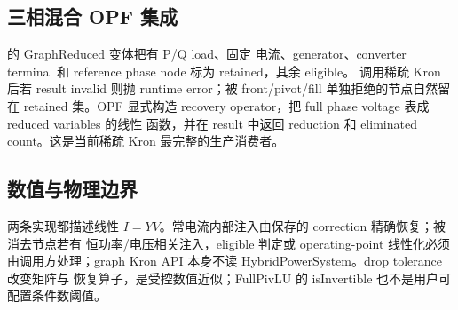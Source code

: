 \subsection{三相混合 OPF 集成}

 的 GraphReduced 变体把有 P/Q load、固定
电流、generator、converter terminal 和 reference phase node 标为 retained，其余 eligible。
调用稀疏 Kron 后若 result invalid 则抛 runtime error；被 front/pivot/fill 单独拒绝的节点自然留在
retained 集。OPF 显式构造 recovery operator，把 full phase voltage 表成 reduced variables 的线性
函数，并在 result 中返回 reduction 和 eliminated count。这是当前稀疏 Kron 最完整的生产消费者。

\subsection{数值与物理边界}

两条实现都描述线性 $I=YV$。常电流内部注入由保存的 correction 精确恢复；被消去节点若有
恒功率/电压相关注入，eligible 判定或 operating-point 线性化必须由调用方处理；graph Kron API
本身不读 HybridPowerSystem。drop tolerance 改变矩阵与
恢复算子，是受控数值近似；FullPivLU 的 isInvertible 也不是用户可配置条件数阈值。
